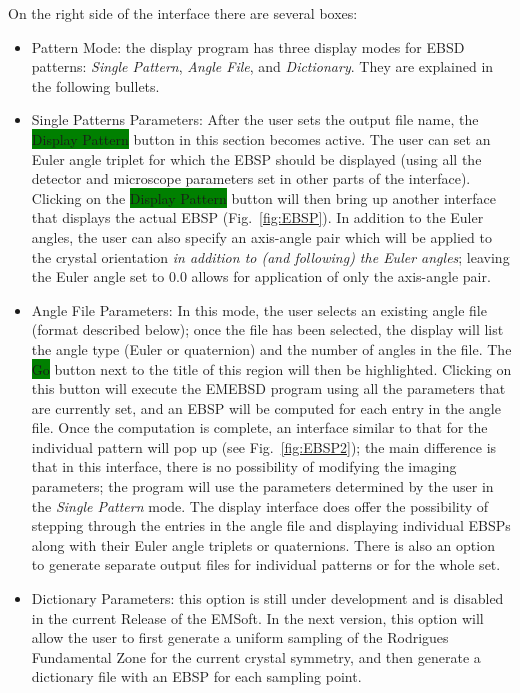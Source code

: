 \documentclass[DIV=calc, paper=letter, fontsize=11pt]{scrartcl}	 %
\newcommand{\ctp}{\textsf{EMSoft}}
\newcommand{\button}[1]{\colorbox{green}{\textsf{#1}} button}
\begin{document}
On the right side of the interface there are several boxes:
\begin{itemize}
	\item \textsf{Pattern Mode}: the display program has three display modes for EBSD patterns: \textit{Single Pattern}, \textit{Angle File},
	and \textit{Dictionary}.  They are explained in the following bullets.
	\item \textsf{Single Patterns Parameters}: After the user sets the output file name, the \button{Display Pattern} in this section 
	becomes active.  The user can set an Euler angle triplet for which the EBSP should be displayed (using all the detector and microscope
	parameters set in other parts of the interface).  Clicking on the \button{Display Pattern} will then bring up another interface that 
	displays the actual EBSP (Fig.~\ref{fig:EBSP}).  In addition to the Euler angles, the user can also specify an axis-angle pair which will
	be applied to the crystal orientation \textit{in addition to (and following) the Euler angles};  leaving the Euler angle set to $0.0$ allows for application 
	of only the axis-angle pair.
	\item \textsf{Angle File Parameters}: In this mode, the user selects an existing angle file (format described below); once the file has been 
	selected, the display will list the angle type (Euler or quaternion) and the number of angles in the file.  The \button{Go} next to the 
	title of this region will then be highlighted.  Clicking on this button will execute the \textsf{EMEBSD} program using all the parameters 
	that are currently set, and an EBSP will be computed for each entry in the angle file.  Once the computation is complete, an interface similar
	to that for the individual pattern will pop up (see Fig.~\ref{fig:EBSP2}); the main difference is that in this interface, there is no possibility of modifying the 
	imaging parameters; the program will use the parameters determined by the user in the \textit{Single Pattern} mode.  The display interface
	does offer the possibility of stepping through the entries in the angle file and displaying individual EBSPs along with their Euler angle
	triplets or quaternions.  There is also an option to generate separate output files for individual patterns or for the whole set.  
	\item \textsf{Dictionary Parameters}: this option is still under development and is disabled in the current Release of the \ctp.  In the next version,
	this option will allow the user to first generate a uniform sampling of the Rodrigues Fundamental Zone for the current crystal symmetry, and then
	generate a dictionary file with an EBSP for each sampling point.  %
\end{itemize}
\end{document}
